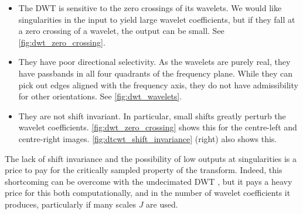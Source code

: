   \begin{itemize}
    \item The DWT is sensitive to the zero crossings of its wavelets. We would
      like singularities in the input to yield large wavelet coefficients, but
      if they fall at a zero crossing of a wavelet, the output can be small. See
      \autoref{fig:dwt_zero_crossing}.
    \item They have poor directional selectivity. As the wavelets are purely
      real, they have passbands in all four quadrants of the frequency plane.
      While they can pick out edges aligned with the frequency axis, they do
      not have admissibility for other orientations. See
      \autoref{fig:dwt_wavelets}.
    \item They are not shift invariant. In particular, small shifts greatly
      perturb the wavelet coefficients. \autoref{fig:dwt_zero_crossing} shows
      this for the centre-left and centre-right images.
      \autoref{fig:dtcwt_shift_invariance} (right) also shows this.
  \end{itemize}

  The lack of shift invariance and the possibility of low outputs at
  singularities is a price to pay for the critically sampled property of the
  transform. Indeed, this shortcoming can be overcome with the undecimated DWT
  \citep{mallat_wavelet_1998,coifman_translation-invariant_1995}, 
  but it pays a heavy price for this both
  computationally, and in the number of wavelet coefficients it produces,
  particularly if many scales $J$ are used. 

  \begin{figure}
    \centering
      \makebox[\textwidth][c]{%
      }
      \label{fig:dwt_zero_crossing}
  \end{figure}

